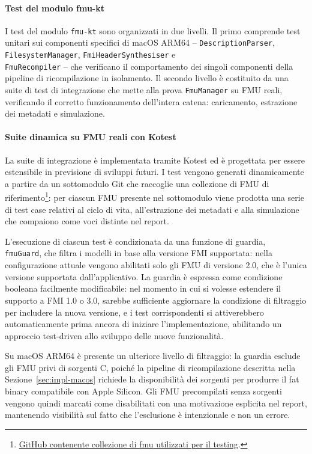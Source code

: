 \paragraph{Test del modulo fmu-kt}

I test del modulo \texttt{fmu-kt} sono organizzati in due livelli. Il primo comprende test unitari sui componenti specifici di macOS ARM64 -- \texttt{DescriptionParser}, \texttt{FilesystemManager}, \texttt{FmiHeaderSynthesiser} e \\\texttt{FmuRecompiler} -- che verificano il comportamento dei singoli componenti della pipeline di ricompilazione in isolamento. Il secondo livello è costituito da una suite di test di integrazione che mette alla prova \texttt{FmuManager} su FMU reali, verificando il corretto funzionamento dell'intera catena: caricamento, estrazione dei metadati e simulazione.

\paragraph{Suite dinamica su FMU reali con Kotest}

La suite di integrazione è implementata tramite Kotest ed è progettata per essere estensibile in previsione di sviluppi futuri. I test vengono generati dinamicamente a partire da un sottomodulo Git che raccoglie una collezione di FMU di riferimento\footnote{\href{https://github.com/CATIA-Systems/dymola-fmi-compatibility}{GitHub contenente collezione di \ac{fmu} utilizzati per il testing}.}: per ciascun FMU presente nel sottomodulo viene prodotta una serie di test case relativi al ciclo di vita, all'estrazione dei metadati e alla simulazione che compaiono come voci distinte nel report.

L'esecuzione di ciascun test è condizionata da una funzione di guardia, \\\texttt{fmuGuard}, che filtra i modelli in base alla versione FMI supportata: nella configurazione attuale vengono abilitati solo gli FMU di versione 2.0, che è l'unica versione supportata dall'applicativo. La guardia è espressa come condizione booleana facilmente modificabile: nel momento in cui si volesse estendere il supporto a FMI 1.0 o 3.0, sarebbe sufficiente aggiornare la condizione di filtraggio per includere la nuova versione, e i test corrispondenti si attiverebbero automaticamente prima ancora di iniziare l'implementazione, abilitando un approccio test-driven allo sviluppo delle nuove funzionalità.

Su macOS ARM64 è presente un ulteriore livello di filtraggio: la guardia esclude gli FMU privi di sorgenti C, poiché la pipeline di ricompilazione descritta nella Sezione~\ref{sec:impl-macos} richiede la disponibilità dei sorgenti per produrre il fat binary compatibile con Apple Silicon. Gli FMU precompilati senza sorgenti vengono quindi marcati come disabilitati con una motivazione esplicita nel report, mantenendo visibilità sul fatto che l'esclusione è intenzionale e non un errore.

